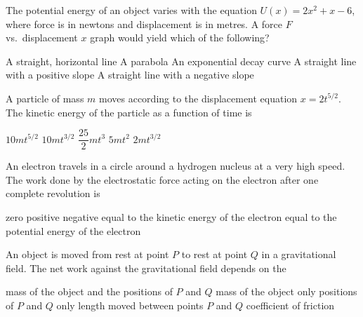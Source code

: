 \documentclass{../../../oss-apphys-exam}
\begin{document}
\begin{questions}
  \question The potential energy of an object varies with the equation
  $U(x)=2x^2+x-6$, where force is in newtons and displacement is in metres. A
  force $F$ vs.\ displacement $x$ graph would yield which of the following?
  \begin{choices}
    \choice A straight, horizontal line
    \choice A parabola
    \choice An exponential decay curve
    \choice A straight line with a positive slope
    \choice A straight line with a negative slope
  \end{choices}
    
  \question A particle of mass $m$ moves according to the displacement equation
  $x=2t^{5/2}$. The kinetic energy of the particle as a function of time is
  \begin{choices}
    \choice $10mt^{5/2}$
    \choice $10mt^{3/2}$
    \choice $\dfrac{25}2mt^3$
    \choice $5mt^2$
    \choice $2mt^{3/2}$
  \end{choices}
    
  \question An electron travels in a circle around a hydrogen nucleus at a very
  high speed. The work done by the electrostatic force acting on the electron
  after one complete revolution is
  \begin{choices}
    \choice zero
    \choice positive
    \choice negative
    \choice equal to the kinetic energy of the electron
    \choice equal to the potential energy of the electron
  \end{choices}
    
  \question An object is moved from rest at point $P$ to rest at point $Q$ in a
  gravitational field. The net work against the gravitational field depends on
  the
  \begin{choices}
    \choice mass of the object and the positions of $P$ and $Q$
    \choice mass of the object only
    \choice positions of $P$ and $Q$ only
    \choice length moved between points $P$ and $Q$
    \choice coefficient of friction
  \end{choices}
    

\end{questions}
\end{document}
